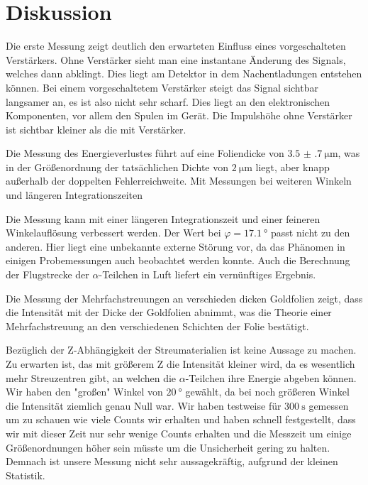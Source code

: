 \section{Diskussion}
\label{sec:Diskussion}
Die erste Messung zeigt deutlich den erwarteten Einfluss eines vorgeschalteten Verstärkers.
Ohne Verstärker sieht man eine instantane Änderung des Signals, welches dann abklingt.
Dies liegt am Detektor in dem Nachentladungen entstehen können.
Bei einem vorgeschaltetem Verstärker steigt das Signal sichtbar langsamer an, es ist also nicht sehr scharf.
Dies liegt an den elektronischen Komponenten, vor allem den Spulen im Gerät.
Die Impulshöhe ohne Verstärker ist sichtbar kleiner als die mit Verstärker.

Die Messung des Energieverlustes führt auf eine Foliendicke von
$\SI{3.5(7)}{\micro\meter}$, was in der Größenordnung der tatsächlichen Dichte von
$\SI{2}{\micro\meter}$ liegt, aber knapp außerhalb der doppelten Fehlerreichweite.
Mit Messungen bei weiteren Winkeln und längeren Integrationszeiten

Die Messung kann mit einer längeren Integrationszeit
und einer feineren Winkelauflösung verbessert werden.
Der Wert bei $φ = \SI{17.1}{\degree}$ passt nicht zu den anderen.
Hier liegt eine unbekannte externe Störung vor,
da das Phänomen in einigen Probemessungen auch beobachtet werden konnte.
Auch die Berechnung der Flugstrecke der $\alpha$-Teilchen in Luft liefert ein
vernünftiges Ergebnis.

Die Messung der Mehrfachstreuungen an verschieden dicken Goldfolien zeigt, dass
die Intensität mit der Dicke der Goldfolien abnimmt, was die Theorie einer
Mehrfachstreuung an den verschiedenen Schichten der Folie bestätigt.

Bezüglich der Z-Abhängigkeit der Streumaterialien ist keine Aussage zu
machen. Zu erwarten ist, das mit größerem Z die Intensität kleiner wird,
da es wesentlich mehr Streuzentren gibt, an welchen die $\alpha$-Teilchen
ihre Energie abgeben können.
Wir haben den "großen" Winkel von $\SI{20}{\degree}$ gewählt, da bei noch
größeren Winkel die Intensität ziemlich genau Null war. Wir haben
testweise für $\SI{300}{\second}$ gemessen um zu schauen wie viele Counts wir
erhalten und haben schnell festgestellt, dass wir mit dieser Zeit nur sehr
wenige Counts erhalten und die Messzeit um einige Größenordnungen höher
sein müsste um die Unsicherheit gering zu halten. Demnach ist unsere Messung
nicht sehr aussagekräftig, aufgrund der kleinen Statistik.
